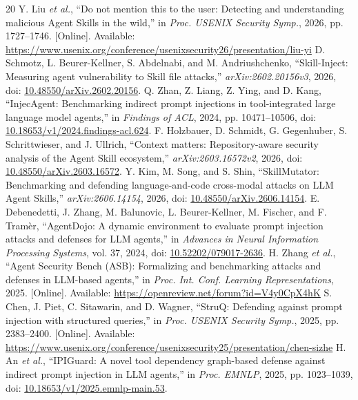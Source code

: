 \begin{thebibliography}{20}
 Y. Liu \emph{et al.}, ``Do not mention this to the user: Detecting and understanding malicious Agent Skills in the wild,'' in \emph{Proc. USENIX Security Symp.}, 2026, pp. 1727--1746. [Online]. Available: \url{https://www.usenix.org/conference/usenixsecurity26/presentation/liu-yi}
 D. Schmotz, L. Beurer-Kellner, S. Abdelnabi, and M. Andriushchenko, ``Skill-Inject: Measuring agent vulnerability to Skill file attacks,'' \emph{arXiv:2602.20156v3}, 2026, doi: \href{https://doi.org/10.48550/arXiv.2602.20156}{10.48550/arXiv.2602.20156}.
 Q. Zhan, Z. Liang, Z. Ying, and D. Kang, ``InjecAgent: Benchmarking indirect prompt injections in tool-integrated large language model agents,'' in \emph{Findings of ACL}, 2024, pp. 10471--10506, doi: \href{https://doi.org/10.18653/v1/2024.findings-acl.624}{10.18653/v1/2024.findings-acl.624}.
 F. Holzbauer, D. Schmidt, G. Gegenhuber, S. Schrittwieser, and J. Ullrich, ``Context matters: Repository-aware security analysis of the Agent Skill ecosystem,'' \emph{arXiv:2603.16572v2}, 2026, doi: \href{https://doi.org/10.48550/arXiv.2603.16572}{10.48550/arXiv.2603.16572}.
 Y. Kim, M. Song, and S. Shin, ``SkillMutator: Benchmarking and defending language-and-code cross-modal attacks on LLM Agent Skills,'' \emph{arXiv:2606.14154}, 2026, doi: \href{https://doi.org/10.48550/arXiv.2606.14154}{10.48550/arXiv.2606.14154}.
 E. Debenedetti, J. Zhang, M. Balunovic, L. Beurer-Kellner, M. Fischer, and F. Tram\`er, ``AgentDojo: A dynamic environment to evaluate prompt injection attacks and defenses for LLM agents,'' in \emph{Advances in Neural Information Processing Systems}, vol. 37, 2024, doi: \href{https://doi.org/10.52202/079017-2636}{10.52202/079017-2636}.
 H. Zhang \emph{et al.}, ``Agent Security Bench (ASB): Formalizing and benchmarking attacks and defenses in LLM-based agents,'' in \emph{Proc. Int. Conf. Learning Representations}, 2025. [Online]. Available: \url{https://openreview.net/forum?id=V4y0CpX4hK}
 S. Chen, J. Piet, C. Sitawarin, and D. Wagner, ``StruQ: Defending against prompt injection with structured queries,'' in \emph{Proc. USENIX Security Symp.}, 2025, pp. 2383--2400. [Online]. Available: \url{https://www.usenix.org/conference/usenixsecurity25/presentation/chen-sizhe}
 H. An \emph{et al.}, ``IPIGuard: A novel tool dependency graph-based defense against indirect prompt injection in LLM agents,'' in \emph{Proc. EMNLP}, 2025, pp. 1023--1039, doi: \href{https://doi.org/10.18653/v1/2025.emnlp-main.53}{10.18653/v1/2025.emnlp-main.53}.

\end{thebibliography}
